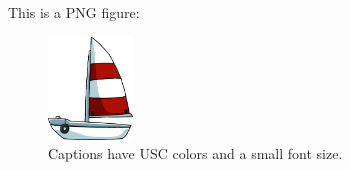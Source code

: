 This is a PNG figure:
\begin{figure}
\centering
\includegraphics[width=0.2\textwidth]{img/boat.png}	
\caption{Captions have USC colors and a small font size.}
\end{figure}
